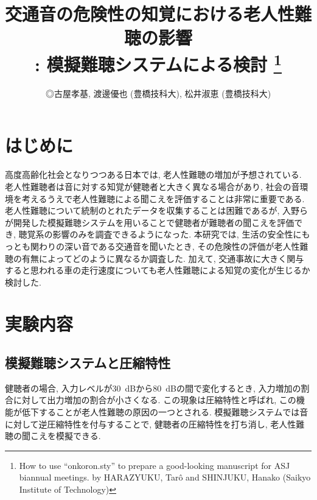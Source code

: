 \documentclass[10pt,twocolumn,uplatex,dvipdfmx]{jsarticle} %
\title{交通音の危険性の知覚における老人性難聴の影響\\ : 模擬難聴システムによる検討
\thanks{How to use ``onkoron.sty'' to prepare a good-looking
manuscript for ASJ biannual meetings. by HARAZYUKU, Tar\^o and
SHINJUKU, Hanako (Saikyo Institute of Technology)}
}
\author{◎古屋孝基, 渡邊優也 (豊橋技科大), 松井淑恵 (豊橋技科大)}
\begin{document}
\maketitle

\section{はじめに}
高度高齢化社会となりつつある日本では, 老人性難聴の増加が予想されている. 老人性難聴者は音に対する知覚が健聴者と大きく異なる場合があり, 社会の音環境を考えるうえで老人性難聴による聞こえを評価することは非常に重要である.
老人性難聴について統制のとれたデータを収集することは困難であるが, 入野らが開発した模擬難聴システムを用いることで健聴者が難聴者の聞こえを評価でき, 聴覚系の影響のみを調査できるようになった\cite{nagae2014hearing}.
本研究では, 生活の安全性にもっとも関わりの深い音である交通音を聞いたとき, その危険性の評価が老人性難聴の有無によってどのように異なるか調査した. 加えて, 交通事故に大きく関与すると思われる車の走行速度についても老人性難聴による知覚の変化が生じるか検討した.

\section{実験内容}

\subsection{模擬難聴システムと圧縮特性}

健聴者の場合, 入力レベルが30~dBから80~dBの間で変化するとき, 入力増加の割合に対して出力増加の割合が小さくなる. この現象は圧縮特性と呼ばれ, この機能が低下することが老人性難聴の原因の一つとされる. 模擬難聴システムでは音に対して逆圧縮特性を付与することで, 健聴者の圧縮特性を打ち消し, 老人性難聴の聞こえを模擬できる.
\end{document}
